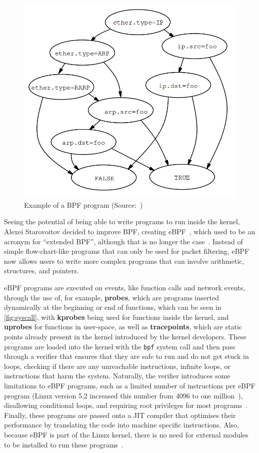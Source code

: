\begin{figure}[htb]
   \centering
   \includegraphics[scale=.3]{bpfprog}
   \caption{Example of a BPF program (Source:~\cite{bpf})}\label{fig:bpfprog}
\end{figure}

Seeing the potential of being able to write programs to run inside the kernel,
Alexei Starovoitov decided to improve \ac{BPF}, creating eBPF~\cite{alexei},
which used to be an acronym for ``extended BPF'', although that is no longer the
case~\cite{ebpfio}. Instead of simple flow-chart-like programs that can only be
used for packet filtering, eBPF now allows users to write more complex programs
that can involve arithmetic, structures, and pointers.

eBPF programs are executed on events, like function calls and network events,
through the use of, for example, \textbf{probes}, which are programs inserted
dynamically at the beginning or end of functions, which can be seen in
\autoref{fig:syscall}, with \textbf{kprobes} being used for functions inside the
kernel, and \textbf{uprobes} for functions in user-space, as well as
\textbf{tracepoints}, which are static points already present in the kernel
introduced by the kernel developers. These programs are loaded into the kernel
with the \texttt{bpf} system call and then pass through a verifier that ensures
that they are safe to run and do not get stuck in loops, checking if there are
any unreachable instructions, infinite loops, or instructions that harm the
system. Naturally, the verifier introduces some limitations to eBPF programs,
such as a limited number of instructions per eBPF program (Linux version 5.2
increased this number from 4096 to one million~\cite{sizelimit}), disallowing
conditional loops, and requiring root privileges for most programs~\cite{lwm}.
Finally, these programs are passed onto a \ac{JIT} compiler that optimises their
performance by translating the code into machine specific instructions. Also,
because eBPF is part of the Linux kernel, there is no need for external modules
to be installed to run these programs~\cite{ebpfio}.


